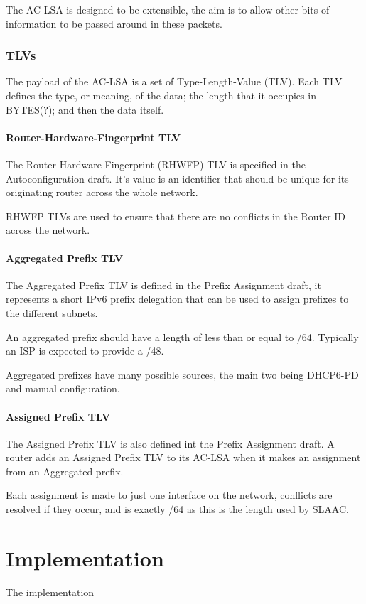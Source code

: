 \documentclass[12pt]{report}
\begin{document}
The AC-LSA is designed to be extensible, the aim is to allow other bits of
information to be passed around in these packets. 

\subsection{TLVs}
The payload of the AC-LSA is a set of Type-Length-Value (TLV). Each TLV
defines the type, or meaning, of the data; the length that it occupies in
BYTES(?); and then the data itself. 

\subsubsection{Router-Hardware-Fingerprint TLV}
The Router-Hardware-Fingerprint (RHWFP) TLV is specified in the
Autoconfiguration draft. It's value is  an identifier that should be unique for
its originating router across the whole network. 

RHWFP TLVs are used to ensure that there are no conflicts in the Router ID
across the network.

\subsubsection{Aggregated Prefix TLV}
The Aggregated Prefix TLV is defined in the Prefix Assignment draft, it
represents a short IPv6 prefix delegation that can be used to assign prefixes
to the different subnets. 

An aggregated prefix should have a length of less than or equal to /64.
Typically an ISP is expected to provide a /48.

Aggregated prefixes have many possible sources, the main two being DHCP6-PD and
manual configuration. 

\subsubsection{Assigned Prefix TLV}
The Assigned Prefix TLV is also defined int the Prefix Assignment draft. A
router adds an Assigned Prefix TLV to its AC-LSA when it makes an assignment
from an Aggregated prefix.  

Each assignment is made to just one interface on the network, conflicts are
resolved if they occur, and is exactly /64 as this is the length used by SLAAC.

\chapter{Implementation}
The implementation
\end{document}
